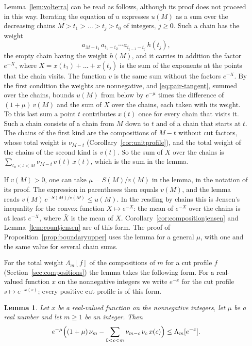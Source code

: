\documentclass{amsart}
\newtheorem{lemma}[theorem]{Lemma}
\theoremstyle{definition}
\theoremstyle{remark}
\numberwithin{equation}{section}
\begin{document}
Lemma~\ref{lem:volterra} can be read as follows, although its proof does not
proceed in this way. Iterating the equation of $u$ expresses $u(M)$ as a
sum over the decreasing chains $M>t_1>\dots>t_j>t_0$ of integers, $j\ge0$.
Such a chain has the weight
\[
a_{M-t_1}\,a_{t_1-t_2}\cdots a_{t_{j-1}-t_j}\,h(t_j),
\]
the empty chain having the weight $h(M)$, and it carries in addition the
factor $e^{-X}$, where $X=x(t_1)+\dots+x(t_j)$ is the sum of the exponents
at the points that the chain visits. The function $v$ is the same sum
without the factors $e^{-X}$.
By the first condition the weights are nonnegative, and
\eqref{eq:pair-tangent}, summed over the chains, bounds $u(M)$ from below by
$e^{-\mu}$ times the difference of $(1+\mu)\,v(M)$ and the sum of $X$ over
the chains, each taken with its weight. To this last sum a point $t$
contributes $x(t)$ once for every chain that visits it. Such a chain
consists of a chain from $M$ down to $t$ and of a chain that starts at $t$.
The chains of the first kind are the compositions of $M-t$ without cut
factors, whose total weight is $\nu_{M-t}$
(Corollary~\ref{cor:unitprofile}), and the total weight of the chains of the
second kind is $v(t)$. So the sum of $X$ over the chains is
$\sum_{t_0<t<M}\nu_{M-t}\,v(t)\,x(t)$, which is the sum in the lemma.

If $v(M)>0$, one can take $\mu=S(M)/v(M)$ in the lemma, in the notation of
its proof. The expression in parentheses then equals $v(M)$, and the lemma
reads $v(M)\,e^{-S(M)/v(M)}\le u(M)$. In the reading by chains this is
Jensen's inequality for the convex function $X\mapsto e^{-X}$: the mean of
$e^{-X}$ over the chains is at least $e^{-\bar X}$, where $\bar X$ is the
mean of $X$. Corollary~\ref{cor:compositionjensen} and
Lemma~\ref{lem:countjensen} are of this form. The proof of
Proposition~\ref{prop:boundaryupper} uses the lemma for a general $\mu$,
with one and the same value for several chain sums.

For the total weight $\Lambda_m[f]$ of the compositions of $m$ for a cut
profile $f$ (Section~\ref{sec:compositions}) the lemma takes the following
form. For a real-valued function $x$ on the nonnegative integers we write
$e^{-x}$ for the cut profile $s\mapsto e^{-x(s)}$; every positive cut
profile is of this form.

\begin{lemma}\label{lem:compositiontangent}
Let $x$ be a real-valued function on the nonnegative integers, let $\mu$ be a
real number and let $m\ge1$ be an integer. Then
\[
e^{-\mu}\Bigl((1+\mu)\,\nu_m-\sum_{0<c<m}\nu_{m-c}\,\nu_c\,x(c)\Bigr)
\le\Lambda_m[e^{-x}].
\]
\end{lemma}
\end{document}
